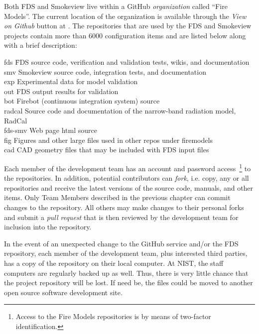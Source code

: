 \documentclass[11pt]{book}
\begin{document}
Both FDS and Smokeview live within a GitHub \emph{organization} called ``Fire Models''.  The current location of the organization is available through the \emph{View on Github} button at \href{https://pages.nist.gov/fds/} {}.  The repositories that are used by the FDS and Smokeview projects contain more than 6000 configuration items and are listed below along with a brief description:
\begin{tabbing}
fds \hspace{0.5in} \= FDS source code, verification and validation tests, wikis, and documentation \\
smv                \> Smokeview source code, integration tests, and documentation \\
exp                \> Experimental data for model validation \\
out                \> FDS output results for validation \\
bot                \> Firebot (continuous integration system) source \\
radcal             \> Source code and documentation of the narrow-band radiation model, RadCal \\
fds-smv            \> Web page html source \\
fig                \> Figures and other large files used in other repos under firemodels \\
cad                \> CAD geometry files that may be included with FDS input files
\end{tabbing}
Each member of the development team has an account and password access~\footnote{Access to the Fire Models repositories is by means of two-factor identification.} to the repositories. In addition, potential contributors can {\em fork}, i.e. copy, any or all repositories and receive the latest versions of the source code, manuals, and other items. Only Team Members described in the previous chapter can commit changes to the repository. All others may make changes to their personal forks and submit a {\em pull request} that is then reviewed by the development team for inclusion into the repository.

In the event of an unexpected change to the GitHub service and/or the FDS repository, each member of the development team, plus interested third parties, has a copy of the repository on their local computer. At NIST, the staff computers are regularly backed up as well. Thus, there is very little chance that the project repository will be lost. If need be, the files could be moved to another open source software development site.
\end{document}
